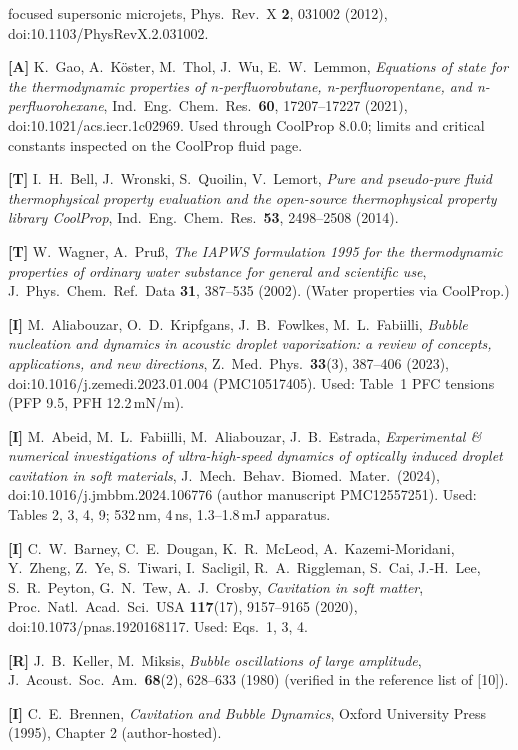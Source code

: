 \begin{enumerate}[leftmargin=*,itemsep=1pt,label={[\arabic*]}]
{focused supersonic microjets}, Phys.\ Rev.\ X \textbf{2}, 031002 (2012), doi:10.1103/PhysRevX.2.031002.
\item \textbf{[A]} K.~Gao, A.~K\"oster, M.~Thol, J.~Wu, E.~W.~Lemmon, \emph{Equations of state for the thermodynamic properties of
n-perfluorobutane, n-perfluoropentane, and n-perfluorohexane}, Ind.\ Eng.\ Chem.\ Res.\ \textbf{60}, 17207--17227 (2021),
doi:10.1021/acs.iecr.1c02969. Used through CoolProp 8.0.0; limits and critical constants inspected on the CoolProp fluid page.
\item \textbf{[T]} I.~H.~Bell, J.~Wronski, S.~Quoilin, V.~Lemort, \emph{Pure and pseudo-pure fluid thermophysical property evaluation
and the open-source thermophysical property library CoolProp}, Ind.\ Eng.\ Chem.\ Res.\ \textbf{53}, 2498--2508 (2014).
\item \textbf{[T]} W.~Wagner, A.~Pru\ss, \emph{The IAPWS formulation 1995 for the thermodynamic properties of ordinary water substance
for general and scientific use}, J.\ Phys.\ Chem.\ Ref.\ Data \textbf{31}, 387--535 (2002). (Water properties via CoolProp.)
\item \textbf{[I]} M.~Aliabouzar, O.~D.~Kripfgans, J.~B.~Fowlkes, M.~L.~Fabiilli, \emph{Bubble nucleation and dynamics in acoustic
droplet vaporization: a review of concepts, applications, and new directions}, Z.\ Med.\ Phys.\ \textbf{33}(3), 387--406 (2023),
doi:10.1016/j.zemedi.2023.01.004 (PMC10517405). Used: Table~1 PFC tensions (PFP 9.5, PFH 12.2\,mN/m).
\item \textbf{[I]} M.~Abeid, M.~L.~Fabiilli, M.~Aliabouzar, J.~B.~Estrada, \emph{Experimental \& numerical investigations of
ultra-high-speed dynamics of optically induced droplet cavitation in soft materials}, J.\ Mech.\ Behav.\ Biomed.\ Mater.\ (2024),
doi:10.1016/j.jmbbm.2024.106776 (author manuscript PMC12557251). Used: Tables 2, 3, 4, 9; 532\,nm, 4\,ns, 1.3--1.8\,mJ apparatus.
\item \textbf{[I]} C.~W.~Barney, C.~E.~Dougan, K.~R.~McLeod, A.~Kazemi-Moridani, Y.~Zheng, Z.~Ye, S.~Tiwari, I.~Sacligil, R.~A.~Riggleman,
S.~Cai, J.-H.~Lee, S.~R.~Peyton, G.~N.~Tew, A.~J.~Crosby, \emph{Cavitation in soft matter}, Proc.\ Natl.\ Acad.\ Sci.\ USA
\textbf{117}(17), 9157--9165 (2020), doi:10.1073/pnas.1920168117. Used: Eqs.~1, 3, 4.
\item \textbf{[R]} J.~B.~Keller, M.~Miksis, \emph{Bubble oscillations of large amplitude}, J.\ Acoust.\ Soc.\ Am.\ \textbf{68}(2),
628--633 (1980) (verified in the reference list of [10]).
\item \textbf{[I]} C.~E.~Brennen, \emph{Cavitation and Bubble Dynamics}, Oxford University Press (1995), Chapter 2 (author-hosted).

\end{enumerate}
